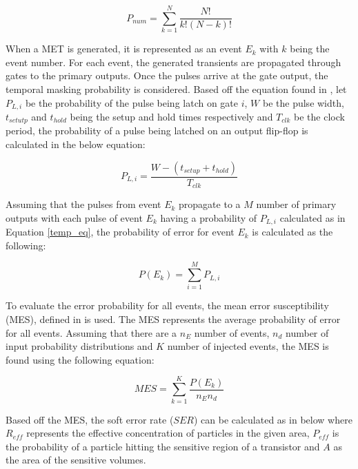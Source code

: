 \documentclass[conference]{IEEEtran}
\begin{document}
\small
\begin{equation} \label{prop_num}
P_{num} = \sum_{k=1}^{N} \frac{N!}{k!(N-k)!}
\end{equation} 
\normalsize

When a MET is generated, it is represented as an event $E_k$ with $k$ being the event number. For each event, the generated transients are propagated through gates to the primary outputs. Once the pulses arrive at the gate output, the temporal masking probability is considered. Based off the equation found in \cite{Omana_Trap}, let  $P_{L,i}$ be the probability of the pulse being latch on gate $i$, $W$ be the pulse width, $t_{setutp}$ and $t_{hold}$ being the setup and hold times respectively and $T_{clk}$ be the clock period, the probability of a pulse being latched on an output flip-flop is calculated in the below equation:

\small
\begin{equation} \label{temp_eq}
P_{L,i} = \frac{W - (t_{setup} + t_{hold})}{T_{clk}}
\end{equation}
\normalsize

Assuming that the pulses from event $E_k$ propagate to a $M$ number of primary outputs with each pulse of event $E_k$ having a probability of $P_{L,i}$ calculated as in Equation \ref{temp_eq}, the probability of error for event $E_k$ is calculated as the following:  

\small
\begin{equation} \label{event_eq}
P(E_k) = \sum_{i=1}^{M} P_{L,i}
\end{equation}
\normalsize

To evaluate the error probability for all events, the mean error susceptibility (MES), defined in \cite{METSys} is used. The MES represents the average probability of error for all events. Assuming that there are a $n_E$ number of events, $n_d$ number of input probability distributions and $K$ number of injected events, the MES is found using the following equation:

\small
\begin{equation} \label{MES}
MES = \sum_{k=1}^{K} \frac{P(E_k)}{n_E n_d}
\end{equation}
\normalsize

Based off the MES, the soft error rate ($SER$) can be calculated as in below where $R_{eff}$ represents the effective concentration of particles in the given area, $P_{eff}$ is the probability of a particle hitting the sensitive region of a transistor and $A$ as the area of the sensitive volumes.
\end{document}
